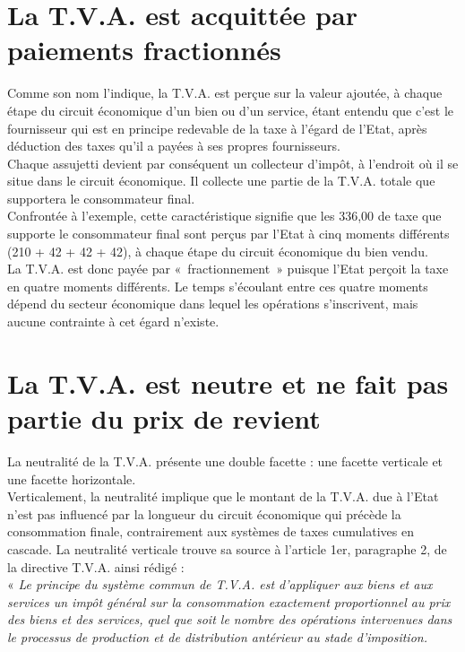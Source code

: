 \documentclass{book}
\begin{document}
\section{La T.V.A. est acquittée par paiements fractionnés}

Comme son nom l'indique, la T.V.A. est perçue sur la valeur ajoutée, à chaque étape du
circuit économique d'un bien ou d'un service, étant entendu que c'est le fournisseur qui est en
principe redevable de la taxe à l'égard de l'Etat, après déduction des taxes qu'il a payées à ses
propres fournisseurs.\\

Chaque assujetti devient par conséquent un collecteur d'impôt, à l'endroit où il se situe dans le
circuit économique. Il collecte une partie de la T.V.A. totale que supportera le consommateur
final.\\

Confrontée à l'exemple, cette caractéristique signifie que les 336,00 de taxe que supporte le
consommateur final sont perçus par l'Etat à cinq moments différents (210 + 42 + 42 +
42), à chaque étape du circuit économique du bien vendu.\\

La T.V.A. est donc payée par «~fractionnement~» puisque l'Etat perçoit la taxe en quatre
moments différents. Le temps s’écoulant entre ces quatre moments dépend du secteur
économique dans lequel les opérations s’inscrivent, mais aucune contrainte à cet égard
n’existe.\\

\section{La T.V.A. est neutre et ne fait pas partie du prix de revient}

La neutralité de la T.V.A. présente une double facette : une facette verticale et une facette
horizontale.\\

Verticalement, la neutralité implique que le montant de la T.V.A. due à l'Etat n'est pas
influencé par la longueur du circuit économique qui précède la consommation finale,
contrairement aux systèmes de taxes cumulatives en cascade. La neutralité verticale trouve sa
source à l’article 1er, paragraphe 2, de la directive T.V.A. ainsi rédigé :\\

«\textit{ Le principe du système commun de T.V.A. est d’appliquer aux biens et aux services un
impôt général sur la consommation exactement proportionnel au prix des biens et des
services, quel que soit le nombre des opérations intervenues dans le processus de production
et de distribution antérieur au stade d’imposition.}\\
\end{document}
